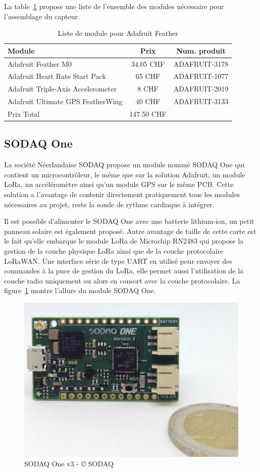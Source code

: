 La table~\ref{tab:ada_feather_liste} propose une liste de l'ensemble des modules nécessaire pour l'assemblage du capteur.

\begin{table}[htb]
\caption[Adafruit Feather List]{Liste de module pour Adafruit Feather}
\label{tab:ada_feather_liste}
\centering
\begin{tabular}{lcc}
\toprule
Module & Prix & Num. produit \\ 
\midrule
Adafruit Feather M0 & 34.05 CHF & ADAFRUIT-3178 \\
Adafruit Heart Rate Start Pack & 65 CHF & ADAFRUIT-1077 \\
Adafruit Triple-Axis Accelerometer & 8 CHF & ADAFRUIT-2019 \\
Adafruit Ultimate GPS FeatherWing & 40 CHF & ADAFRUIT-3133 \\
\midrule
Prix Total & 147.50 CHF &  \\
\bottomrule 
\end{tabular}
\end{table}

\subsection{SODAQ One}

La société Néerlandaise SODAQ propose un module nommé SODAQ One qui contient un microcontrôleur, le même que sur la solution Adafruit, un module LoRa, un accéléromètre ainsi qu’un module GPS sur le même PCB. Cette solution a l’avantage de contenir directement pratiquement tous les modules nécessaires au projet, reste la sonde de rythme cardiaque à intégrer. 

Il est possible d’alimenter le SODAQ One avec une batterie lithium-ion, un petit panneau solaire est également proposé. Autre avantage de taille de cette carte est le fait qu’elle embarque le module LoRa de Microchip RN2483 qui propose la gestion de la couche physique LoRa ainsi que de la couche protocolaire LoRaWAN. Une interface série de type UART en utilisé pour envoyer des commandes à la puce de gestion du LoRa, elle permet aussi l’utilisation de la couche radio uniquement ou alors en consort avec la couche protocolaire. La figure~\ref{fig:sodaq_one} montre l'allure du module SODAQ One.

\begin{figure}[htb]
\centering 
\includegraphics[width=0.4\columnwidth]{../images/sodaq-one-eu-rn2483-v3.jpg} 
\caption[SODAQ One]{SODAQ One v3 - © SODAQ}
\label{fig:sodaq_one}
\end{figure}

